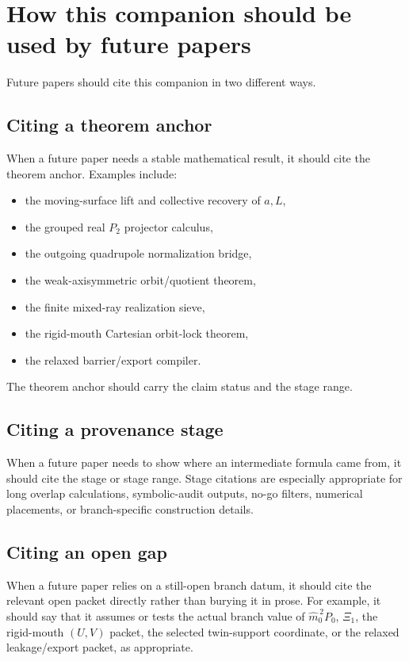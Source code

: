 \section{How this companion should be used by future papers}

Future papers should cite this companion in two different ways.

\subsection{Citing a theorem anchor}

When a future paper needs a stable mathematical result, it should cite the theorem anchor.  Examples include:
\begin{itemize}[leftmargin=2.2em]
  \item the moving-surface lift and collective recovery of \(a,L\),
  \item the grouped real \(P_2\) projector calculus,
  \item the outgoing quadrupole normalization bridge,
  \item the weak-axisymmetric orbit/quotient theorem,
  \item the finite mixed-ray realization sieve,
  \item the rigid-mouth Cartesian orbit-lock theorem,
  \item the relaxed barrier/export compiler.
\end{itemize}

The theorem anchor should carry the claim status and the stage range.

\subsection{Citing a provenance stage}

When a future paper needs to show where an intermediate formula came from, it should cite the stage or stage range.  Stage citations are especially appropriate for long overlap calculations, symbolic-audit outputs, no-go filters, numerical placements, or branch-specific construction details.

\subsection{Citing an open gap}

When a future paper relies on a still-open branch datum, it should cite the relevant open packet directly rather than burying it in prose.  For example, it should say that it assumes or tests the actual branch value of \(\widehat m_0^{\,2}P_0\), \(\Xi_1\), the rigid-mouth \((U,V)\) packet, the selected twin-support coordinate, or the relaxed leakage/export packet, as appropriate.

